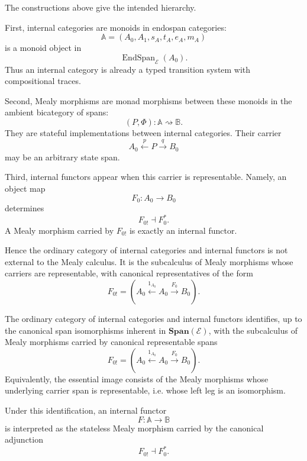 The constructions above give the intended hierarchy.

First, internal categories are monoids in endospan categories:
\[
\mathbb A
=
(A_0,A_1,s_A,t_A,e_A,m_A)
\]
is a monoid object in
\[
\operatorname{EndSpan}_{\mathcal E}(A_0).
\]
Thus an internal category is already a typed transition system with compositional traces.

Second, Mealy morphisms are monad morphisms between these monoids in the ambient bicategory of spans:
\[
(P,\Phi):\mathbb A\rightsquigarrow\mathbb B.
\]
They are stateful implementations between internal categories. Their carrier
\[
A_0\xleftarrow{p}P\xrightarrow{q}B_0
\]
may be an arbitrary state span.

Third, internal functors appear when this carrier is representable. Namely, an object map
\[
F_0:A_0\to B_0
\]
determines
\[
F_{0!}\dashv F_0^\ast.
\]
A Mealy morphism carried by \(F_{0!}\) is exactly an internal functor.

Hence the ordinary category of internal categories and internal functors is not external to the Mealy calculus. It is the subcalculus of Mealy morphisms whose carriers are representable, with canonical representatives of the form
\[
F_{0!}
=
\left(
A_0
\xleftarrow{1_{A_0}}
A_0
\xrightarrow{F_0}
B_0
\right).
\]

\begin{theorem}
\label{thm:internal-functors-left-adjoint-subcalculus}
The ordinary category of internal categories and internal functors identifies, up to the canonical span isomorphisms inherent in \(\mathbf{Span}(\mathcal E)\), with the subcalculus of Mealy morphisms carried by canonical representable spans
\[
F_{0!}
=
\left(
A_0
\xleftarrow{1_{A_0}}
A_0
\xrightarrow{F_0}
B_0
\right).
\]
Equivalently, the essential image consists of the Mealy morphisms whose underlying carrier span is representable, i.e. whose left leg is an isomorphism.

Under this identification, an internal functor
\[
F:\mathbb A\to\mathbb B
\]
is interpreted as the stateless Mealy morphism carried by the canonical adjunction
\[
F_{0!}\dashv F_0^\ast.
\]
\end{theorem}


